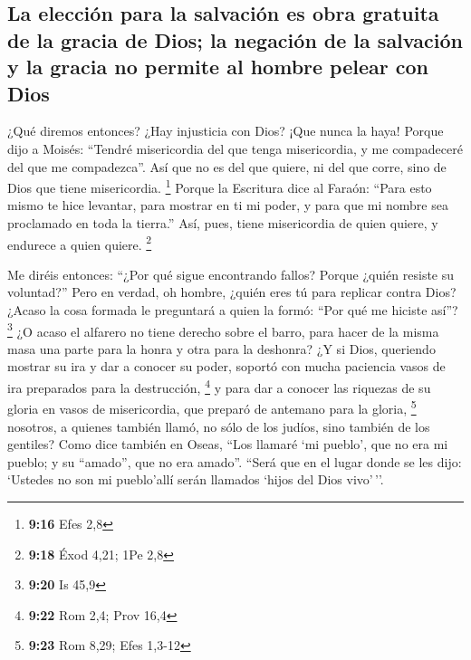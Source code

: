 \hypertarget{la-elecciuxf3n-para-la-salvaciuxf3n-es-obra-gratuita-de-la-gracia-de-dios-la-negaciuxf3n-de-la-salvaciuxf3n-y-la-gracia-no-permite-al-hombre-pelear-con-dios}{%
\subsection{La elección para la salvación es obra gratuita de la gracia
de Dios; la negación de la salvación y la gracia no permite al hombre
pelear con
Dios}\label{la-elecciuxf3n-para-la-salvaciuxf3n-es-obra-gratuita-de-la-gracia-de-dios-la-negaciuxf3n-de-la-salvaciuxf3n-y-la-gracia-no-permite-al-hombre-pelear-con-dios}}

 ¿Qué diremos entonces? ¿Hay injusticia con Dios? ¡Que
nunca la haya!  Porque dijo a Moisés: ``Tendré
misericordia del que tenga misericordia, y me compadeceré del que me
compadezca''.  Así que no es del que quiere, ni del que
corre, sino de Dios que tiene misericordia. \footnote{\textbf{9:16} Efes
  2,8}  Porque la Escritura dice al Faraón: ``Para esto
mismo te hice levantar, para mostrar en ti mi poder, y para que mi
nombre sea proclamado en toda la tierra.''  Así, pues,
tiene misericordia de quien quiere, y endurece a quien quiere.
\footnote{\textbf{9:18} Éxod 4,21; 1Pe 2,8}

 Me diréis entonces: ``¿Por qué sigue encontrando fallos?
Porque ¿quién resiste su voluntad?''  Pero en verdad, oh
hombre, ¿quién eres tú para replicar contra Dios? ¿Acaso la cosa formada
le preguntará a quien la formó: ``Por qué me hiciste así''? \footnote{\textbf{9:20}
  Is 45,9}  ¿O acaso el alfarero no tiene derecho sobre
el barro, para hacer de la misma masa una parte para la honra y otra
para la deshonra?  ¿Y si Dios, queriendo mostrar su ira y
dar a conocer su poder, soportó con mucha paciencia vasos de ira
preparados para la destrucción, \footnote{\textbf{9:22} Rom 2,4; Prov
  16,4}  y para dar a conocer las riquezas de su gloria
en vasos de misericordia, que preparó de antemano para la gloria,
\footnote{\textbf{9:23} Rom 8,29; Efes 1,3-12}  nosotros,
a quienes también llamó, no sólo de los judíos, sino también de los
gentiles?  Como dice también en Oseas, ``Los llamaré `mi
pueblo', que no era mi pueblo; y su ``amado'', que no era amado''.
 ``Será que en el lugar donde se les dijo: `Ustedes no
son mi pueblo'allí serán llamados `hijos del Dios vivo'\,''.

